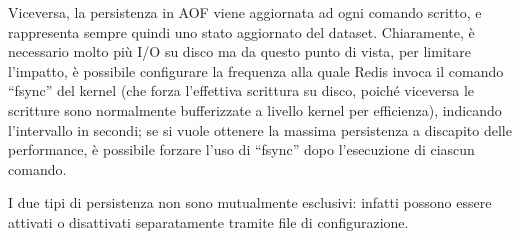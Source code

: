 Viceversa, la persistenza in AOF viene aggiornata ad ogni comando scritto, e rappresenta sempre
quindi uno stato aggiornato del dataset. Chiaramente, è necessario molto più I/O su disco ma
da questo punto di vista, per limitare l'impatto, è possibile configurare la frequenza alla
quale Redis invoca il comando ``fsync'' del kernel (che forza l'effettiva scrittura su
disco, poiché viceversa le scritture sono normalmente bufferizzate a livello kernel per
efficienza), indicando l'intervallo in secondi; se si vuole ottenere la massima persistenza a
discapito delle performance, è possibile forzare l'uso di ``fsync'' dopo l'esecuzione di
ciascun comando.

I due tipi di persistenza non sono mutualmente esclusivi: infatti possono essere attivati o 
disattivati separatamente tramite file di configurazione.